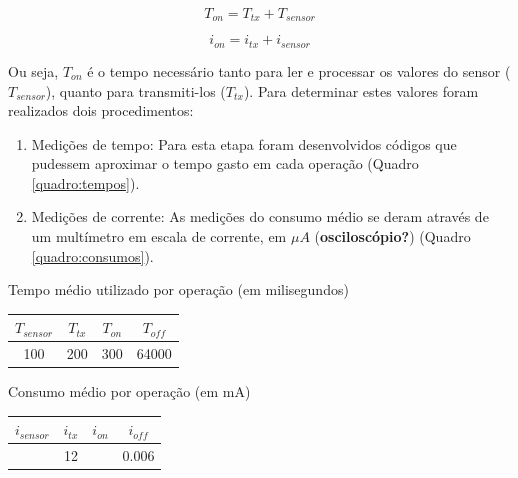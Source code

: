 \documentclass[oneside,openright,12pt]{ufsm_2015} %
\begin{document}
    \begin{equation}
        T_{on} = T_{tx} + T_{sensor}
    \end{equation}
    
    \begin{equation}
        i_{on} = i_{tx} + i_{sensor}
    \end{equation}
    
    Ou seja, $T_{on}$ é o tempo necessário tanto para ler e processar os valores do sensor ($T_{sensor}$), quanto para transmiti-los ($T_{tx}$). Para determinar estes valores foram realizados dois procedimentos:
    
    \begin{enumerate}
        \item Medições de tempo: Para esta etapa foram desenvolvidos códigos que pudessem aproximar o tempo gasto em cada operação (Quadro \ref{quadro:tempos}). 
        
        \item Medições de corrente: As medições do consumo médio se deram através de um multímetro em escala de corrente, em $\mu A$ (\textbf{osciloscópio?}) (Quadro \ref{quadro:consumos}).
    \end{enumerate}
    
    \begin{quadro}
   	    \caption{Tempo médio utilizado por operação (em milisegundos)}
	    \centering
	    \begin{tabular}{| c |c |c |c |}
	    \hline
	    $T_{sensor}$ & $T_{tx}$ & $T_{on}$ & $T_{off}$ \\
	    \hline
	    100 & 200 & 300 & 64000\\
	    \hline
	    \end{tabular}
	    \vspace{\baselineskip} %
	    \label{quadro:tempos}
    \end{quadro}
    
    \begin{quadro}
   	    \caption{Consumo médio por operação (em mA)}
	    \centering
	    \begin{tabular}{| c |c |c |c |}
	    \hline
	    $i_{sensor}$ & $i_{tx}$ & $i_{on}$ & $i_{off}$ \\
	    \hline
	     & 12 &  & 0.006\\
	    \hline
	    \end{tabular}
	    \vspace{\baselineskip} %
	    \label{quadro:consumos}
    \end{quadro}
    
\end{document}
